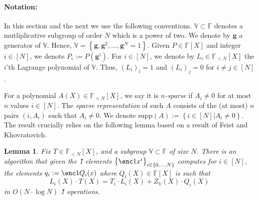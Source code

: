 \documentclass[11pt]{article} %
\newcommand{\F}{\ensuremath{\mathbb F}\xspace}
\newcommand{\defeq}{:=}
\newcommand{\sett}[2]{\ensuremath{\set{#1}_{#2}}\xspace}
\newcommand{\set}[1]{\ensuremath{\left\{#1\right\}}\xspace}
\newcommand{\vgen}{\ensuremath{\mathbf{g}}\xspace}
\newcommand{\polysofdeg}[1]{\ensuremath{\F_{< #1}[X]}\xspace}
\newtheorem{lemma}{Lemma}[section]
\newcommand{\bigspace}{\ensuremath{\mathbb{V}}\xspace}
\newcommand{\witsize}{\ensuremath{n}\xspace}
\newcommand{\tabsize}{\ensuremath{N}\xspace}
\newcommand{\supp}[1]{\ensuremath{\mathrm{supp}(#1)}\xspace}
\begin{document}
\paragraph{Notation:}
In this section and the next we use the following conventions.
$\bigspace\subset \F$ denotes a mutliplicative subgroup of order $N$ which is a power of two.
We denote by \vgen a generator of \bigspace. Hence, $\bigspace=\set{\vgen,\vgen^2,\ldots,\vgen^\tabsize =1}$.
Given $P\in \F[X]$ and integer $i\in [\tabsize]$, we denote $P_i\defeq P(\vgen^i)$.
For $i\in [\tabsize]$, we denote by $L_i\in\polysofdeg{\tabsize}$ the $i$'th Lagrange polynomial of \bigspace. Thus, $(L_i)_i=1$ and $(L_i)_j=0$ for $i\neq j\in [\tabsize]$. 

For a polynomial $A(X)\in \polysofdeg{\tabsize}$, we say it is \emph{\witsize-sparse} if $A_i\neq 0$ for at most \witsize values $i\in[\tabsize]$.
The \emph{sparse representation} of such $A$ consists of the (at most) \witsize pairs $(i,A_i)$ such that $A_i\neq 0$.
We denote $\supp{A}\defeq\set{i\in [\tabsize]| A_i\neq 0}$.\\

The result crucially relies on the following lemma based on a result of Feist and Khovratovich\cite{fastkzgproofsorig}.

\begin{lemma}
\label{lem:cq-compute}
Fix $T\in \polysofdeg{\tabsize}$, and a subgroup $\bigspace\subset \F$ of size \tabsize. 
There is an algorithm that given the \G1 elements $\sett{\enc1{x^i}}{i\in \set{0,\ldots,\tabsize}}$ computes for $i\in [\tabsize]$, the elements 
$q_i\defeq \enc1{Q_i(x)}$
where $Q_i(X)\in \F[X]$ is such that
\[L_i(X)\cdot T(X)=T_i\cdot L_i(X) + Z_\bigspace(X)\cdot Q_i(X)\]
in $O(\tabsize\cdot \log \tabsize)$ \G1 operations.
 
\end{lemma}
\end{document}
